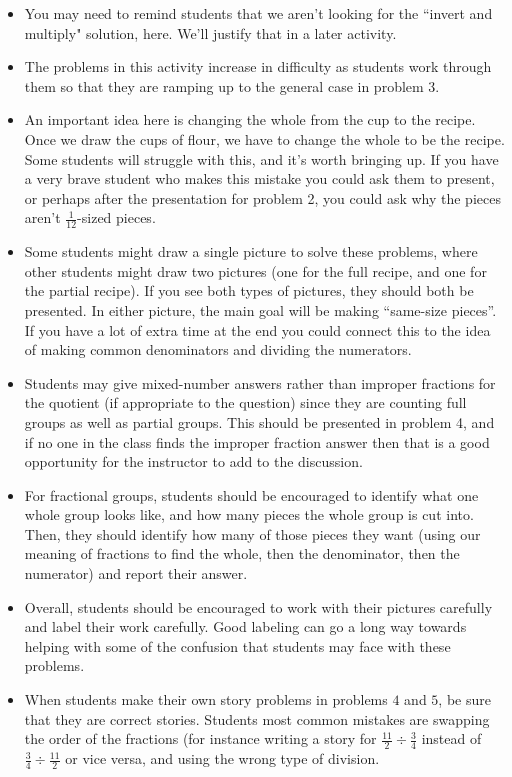 \documentclass[nooutcomes,noauthor, handout]{ximera}
\begin{document}
\begin{instructorNotes}
\begin{itemize}
	\item You may need to remind students that we aren't looking for the ``invert and multiply" solution, here. We'll justify that in a later activity.
	\item The problems in this activity increase in difficulty as students work through them so that they are ramping up to the general case in problem 3.
	\item An important idea here is changing the whole from the cup to the recipe. Once we draw the cups of flour, we have to change the whole to be the recipe. Some students will struggle with this, and it's worth bringing up. If you have a very brave student who makes this mistake you could ask them to present, or perhaps after the presentation for problem 2, you could ask why the pieces aren't $\frac{1}{12}$-sized pieces. 
	\item Some students might draw a single picture to solve these problems, where other students might draw two pictures (one for the full recipe, and one for the partial recipe). If you see both types of pictures, they should both be presented. In either picture, the main goal will be making ``same-size pieces''. If you have a lot of extra time at the end you could connect this to the idea of making common denominators and dividing the numerators.
	\item Students may give mixed-number answers rather than improper fractions for the quotient (if appropriate to the question) since they are counting full groups as well as partial groups. This should be presented in problem 4, and if no one in the class finds the improper fraction answer then that is a good opportunity for the instructor to add to the discussion.
	\item For fractional groups, students should be encouraged to identify what one whole group looks like, and how many pieces the whole group is cut into. Then, they should identify how many of those pieces they want (using our meaning of fractions to find the whole, then the denominator, then the numerator) and report their answer. 
	\item Overall, students should be encouraged to work with their pictures carefully and label their work carefully. Good labeling can go a long way towards helping with some of the confusion that students may face with these problems.
	\item When students make their own story problems in problems $4$ and $5$, be sure that they are correct stories. Students most common mistakes are swapping the order of the fractions (for instance writing a story for $\frac{11}{2} \div \frac{3}{4}$ instead of $\frac{3}{4} \div \frac{11}{2}$ or vice versa, and using the wrong type of division.
\end{itemize}



\end{instructorNotes}
\end{document}
